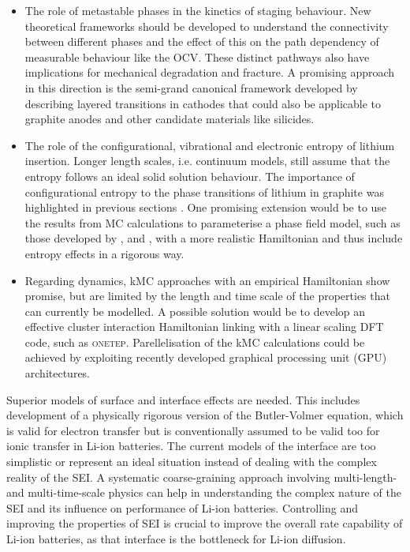 \documentclass[../main.tex]{subfiles}
\begin{document}
\begin{itemize}
    \item The role of metastable phases in the kinetics of staging behaviour. New theoretical frameworks should be developed to understand the connectivity between different phases and the effect of this on the path dependency of measurable behaviour like the OCV. These distinct pathways also have implications for mechanical degradation and fracture. A promising approach in this direction is the semi-grand canonical framework developed by \citeauthor{VanderVen2020,vanderven2018} describing layered transitions in cathodes \cite{VanderVen2020,radin_role_2017,Vinck2016,vanderven2018} that could also be applicable to graphite anodes and other candidate materials like silicides. 
    \item The role of the configurational, vibrational and electronic entropy of lithium insertion. Longer length scales, i.e. continuum models, still assume that the entropy follows an ideal solid solution behaviour. The importance of configurational entropy to the phase transitions of lithium in graphite was highlighted in previous sections \cite{Mercer2019,Mercer2021,REYNIER2003850}. One promising extension would be to use the results from MC calculations to parameterise a phase field model, such as those developed by \citeauthor{Bazant2017},\cite{Bazant2017} \citeauthor{guo2016}\cite{guo2016} and \citeauthor{peng2011},\cite{peng2011} with a more realistic Hamiltonian and thus include entropy effects in a rigorous way.
    \item Regarding dynamics, kMC approaches with an empirical Hamiltonian show promise,\cite{gavilan-arriazu_kinetic_2020,gavilan-arriazu_effect_2020,GAVILANARRIAZU2018133,Gavil_n_Arriazu_2021_kmc} but are limited by the length and time scale of the properties that can currently be modelled. A possible solution would be to develop an effective cluster interaction Hamiltonian linking with a linear scaling DFT code, such as \textsc{onetep}. Parellelisation of the kMC calculations could be achieved by exploiting recently developed graphical processing unit (GPU) architectures.
\end{itemize}

Superior models of surface and interface effects are needed. This includes development of a physically rigorous version of the Butler-Volmer equation, which is valid for electron transfer but is conventionally assumed to be valid too for ionic transfer in Li-ion batteries. The current models of the interface are too simplistic or represent an ideal situation instead of dealing with the complex reality of the SEI. A systematic coarse-graining approach involving multi-length- and multi-time-scale physics can help in understanding the complex nature of the SEI and its influence on performance of Li-ion batteries. Controlling and improving the properties of SEI is crucial to improve the overall rate capability of Li-ion batteries, as that interface is the bottleneck for Li-ion diffusion.
\end{document}
